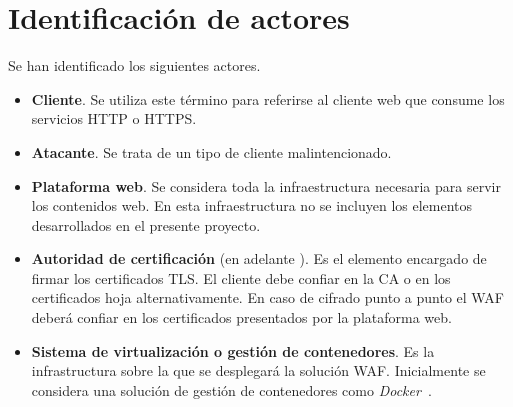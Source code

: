 \section{Identificación de actores}
\par Se han identificado los siguientes actores.
\begin{itemize}
  \item {\bf Cliente}. Se utiliza este término para referirse al cliente web que consume los servicios HTTP o HTTPS.
  \item {\bf \Gls{Atacante}}. Se trata de un tipo de cliente malintencionado.
  \item {\bf Plataforma web}. Se considera toda la infraestructura necesaria para servir los contenidos web. En esta infraestructura no se incluyen los elementos desarrollados en el presente proyecto.
  \item {\bf Autoridad de certificación} (en adelante ). Es el elemento encargado de firmar los certificados TLS. El cliente debe confiar en la CA o en los certificados hoja alternativamente. En caso de cifrado punto a punto el WAF deberá confiar en los certificados presentados por la plataforma web.
  \item {\bf Sistema de virtualización o gestión de contenedores}. Es la infrastructura sobre la que se desplegará la solución WAF. Inicialmente se
    considera una solución de gestión de contenedores como {\em Docker~\cite{docker}}.
\end{itemize}

\clearpage
